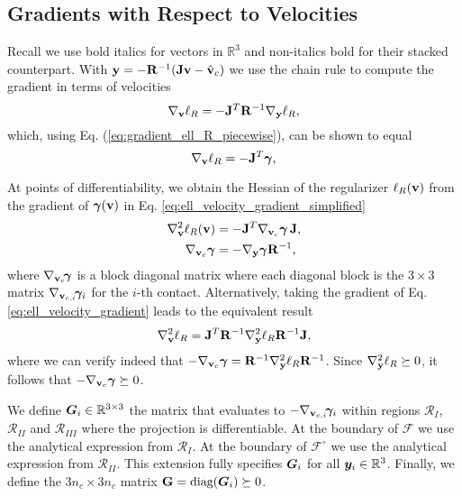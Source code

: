 \subsection{Gradients with Respect to Velocities}
Recall we use bold italics for vectors in $\mathbb{R}^3$ and non-italics bold
for their stacked counterpart. With ${\mathbf{y}}=-{\mathbf{R}}^{-1}({\mathbf{J}}{\mathbf{v}} -
\hat{{\mathbf{v}}}_c)$ we use the chain rule to compute the gradient in terms of
velocities 
\begin{equation}
	\nabla_\mf{v}\ell_R = -\mf{J}^T\mf{R}^{-1}\nabla_\mf{y}\ell_R,
	\label{eq:ell_velocity_gradient}
\end{equation}
which, using Eq. (\ref{eq:gradient_ell_R_piecewise}), can be shown to equal
\begin{equation}
	\nabla_\mf{v}\ell_R = -\mf{J}^T\bgamma,
	\label{eq:ell_velocity_gradient_simplified}
\end{equation}

At points of differentiability, we obtain the Hessian of the regularizer
$\ell_R({\mathbf{v}})$ from the gradient of ${\bm\gamma}({\mathbf{v}})$ in Eq.
\eqref{eq:ell_velocity_gradient_simplified}
\begin{align*}
	\nabla_{\mathbf{v}}^2\ell_R({\mathbf{v}}) &= -{\mathbf{J}}^T \nabla_{{\mathbf{v}}_c}{\bm\gamma}\,{\mathbf{J}}\nonumber,\\
	\nabla_{{\mathbf{v}}_c}{\bm\gamma} &= -\nabla_{\mathbf{y}}{\bm\gamma} {\mathbf{R}}^{-1},
\end{align*}
where $\nabla_{{\mathbf{v}}_c}\!{\bm\gamma}$ is a block diagonal matrix where each
diagonal block is the $3\times 3$ matrix $\nabla_{{\mathbf{v}}_{c,i}}\!{\bm\gamma}_i$
for the $i\text{-th}$ contact. Alternatively, taking the gradient of Eq. \eqref{eq:ell_velocity_gradient} leads to the equivalent result
\begin{equation*}
	\nabla_{\mathbf{v}}^2\ell_R = {\mathbf{J}}^T{\mathbf{R}}^{-1}\nabla_{\mathbf{y}}^2\ell_R{\mathbf{R}}^{-1}{\mathbf{J}},
\end{equation*}
where we can verify indeed that
$-\nabla_{{\mathbf{v}}_c}{\bm\gamma}={\mathbf{R}}^{-1}\nabla_{\mathbf{y}}^2\ell_R{\mathbf{R}}^{-1}$. Since
$\nabla_{\mathbf{y}}^2\ell_R\succeq 0$, it follows that
$-\nabla_{{\mathbf{v}}_c}{\bm\gamma}\succeq 0$.

We define ${\bm{G}}_i\in\mathbb{R}^{3\times 3}$ the matrix that evaluates to
$-\nabla_{{\mathbf{v}}_{c,i}}\!{\bm\gamma}_i$ within regions $\mathcal{R}_I$,
$\mathcal{R}_{II}$ and $\mathcal{R}_{III}$ where the projection is
differentiable. At the boundary of $\mathcal{F}$ we use the analytical
expression from $\mathcal{R}_I$. At the boundary of $\mathcal{F}^\circ$ we use
the analytical expression from $\mathcal{R}_{II}$. This extension fully
specifies ${\bm{G}}_i$ for all ${\bm{y}}_i\in\mathbb{R}^3$. Finally, we define the
${3n_c\times 3n_c}$ matrix ${\mathbf{G}}=\text{diag}({\bm{G}}_i)\succeq 0$.

